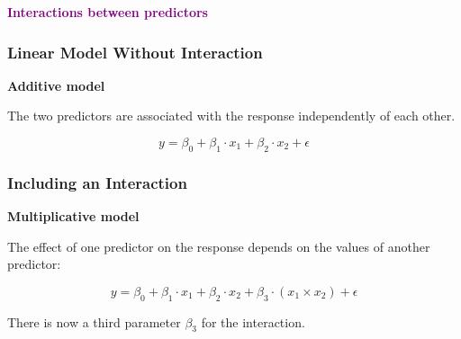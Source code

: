 \documentclass{beamer}
\begin{document}
\begin{frame}{}
  \begin{center}
    \huge\textbf{\textcolor{purple}{Interactions between predictors}}
  \end{center}
\end{frame}

\begin{frame}
  \frametitle{Linear Model Without Interaction}
  \textbf{Additive model}
  
  The two predictors are associated with the response independently of each other.
  
  \begin{equation*}
    y = \beta_0 + \beta_1 \cdot x_1 + \beta_2 \cdot x_2 + \epsilon
  \end{equation*}
\end{frame}

\begin{frame}
  \frametitle{Including an Interaction}
  \textbf{Multiplicative model}
  
  The effect of one predictor on the response depends on the values of another predictor:
  
  \begin{equation*}
    y = \beta_0 + \beta_1 \cdot x_1 + \beta_2 \cdot x_2 + \beta_3 \cdot (x_1 \times x_2) + \epsilon
  \end{equation*}
  
  There is now a third parameter $\beta_3$ for the interaction.
\end{frame}
\end{document}
